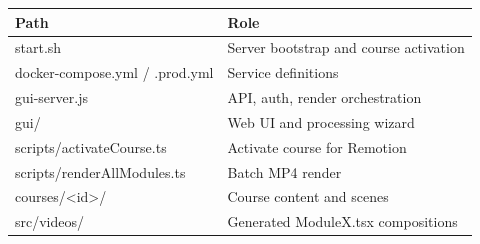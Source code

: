 \documentclass{scinexus}
\newcommand{\tableheadrow}[1]{\sffamily\bfseries\color{rbnavy} #1}
\begin{document}
\begin{table}[htbp]
	\centering
	\footnotesize
	\begin{tabularx}{\textwidth}{@{}l L@{}}
		\toprule
		\tableheadrow{Path} & \tableheadrow{Role} \\
		\midrule
		start.sh & Server bootstrap and course activation \\
		docker-compose.yml / .prod.yml & Service definitions \\
		gui-server.js & API, auth, render orchestration \\
		gui/ & Web UI and processing wizard \\
		scripts/activateCourse.ts & Activate course for Remotion \\
		scripts/renderAllModules.ts & Batch MP4 render \\
		courses/<id>/ & Course content and scenes \\
		src/videos/ & Generated ModuleX.tsx compositions \\
		\bottomrule
	\end{tabularx}
\end{table}

\vspace{1em}
\end{document}
